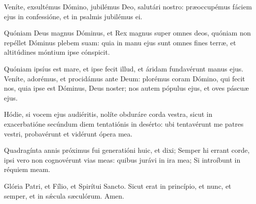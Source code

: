 \item Veníte, exsultémus Dómino, jubilémus Deo, salutári nostro: præoccupémus fáciem ejus in confessióne, et in psalmis jubilémus ei. 
\item Quóniam Deus magnus Dóminus, et Rex magnus super omnes deos, quóniam non repéllet Dóminus plebem suam: quia in manu ejus sunt omnes fines terræ, et altitúdines móntium ipse cónspicit.\\
\item Quóniam ipsíus est mare, et ipse fecit illud, et áridam fundavérunt manus ejus.  Veníte, adorémus, et procidámus ante Deum: plorémus coram Dómino, qui fecit nos, quia ipse est Dóminus, Deus noster; nos autem pópulus ejus, et oves páscuæ ejus. 
\item Hódie, si vocem ejus audiéritis, nolíte obduráre corda vestra, sicut in exacerbatióne secúndum diem tentatiónis in desérto: ubi tentavérunt me patres vestri, probavérunt et vidérunt ópera mea.\\
\item Quadragínta annis próximus fui generatióni huic, et dixi; Semper hi errant corde, ipsi vero non cognovérunt vias meas: quibus jurávi in ira mea; Si introíbunt in réquiem meam. 
\item Glória Patri, et Fílio, et Spirítui Sancto. Sicut erat in princípio, et nunc, et semper, et in sǽcula sæculórum. Amen. \\